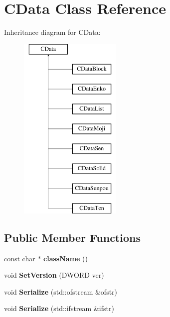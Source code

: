 \hypertarget{classCData}{\section{C\-Data Class Reference}
\label{classCData}
}
Inheritance diagram for C\-Data\-:\begin{figure}[H]
\begin{center}
\leavevmode
\includegraphics[height=9.000000cm]{classCData}
\end{center}
\end{figure}
\subsection*{Public Member Functions}
\begin{DoxyCompactItemize}
\item 
\hypertarget{classCData_a468e87bd671d5ce452f6ac32a7f568ba}{const char $\ast$ {\bfseries class\-Name} ()}\label{classCData_a468e87bd671d5ce452f6ac32a7f568ba}

\item 
\hypertarget{classCData_a8cc630f4bd0ddc6a0548de1e687e8898}{void {\bfseries Set\-Version} (D\-W\-O\-R\-D ver)}\label{classCData_a8cc630f4bd0ddc6a0548de1e687e8898}

\item 
\hypertarget{classCData_a9fe4ed5a532c82461cc204f8ffcb1889}{void {\bfseries Serialize} (std\-::ofstream \&ofstr)}\label{classCData_a9fe4ed5a532c82461cc204f8ffcb1889}

\item 
\hypertarget{classCData_a99e94f076c715be7394e6db8056ffd88}{void {\bfseries Serialize} (std\-::ifstream \&ifstr)}\label{classCData_a99e94f076c715be7394e6db8056ffd88}

\end{DoxyCompactItemize}
